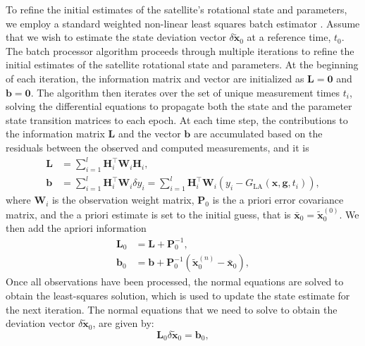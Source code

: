 \documentclass[lineno, pdflatex,sn-mathphys-ay]{sn-jnl}
\theoremstyle{thmstyleone}%
\theoremstyle{thmstyletwo}%
\theoremstyle{thmstylethree}%
\renewcommand{\vec}[1]{\boldsymbol{#1}}
\begin{document}
	To refine the initial estimates of the satellite's rotational state and parameters, we employ a standard weighted non-linear least squares batch estimator \citep[e.g.,][]{2004sod..book.....T}. 
	Assume that we wish to estimate the state deviation vector $\delta\tilde{\vec{x}}_0$ at a reference time, $t_0$.
	The batch processor algorithm proceeds through multiple iterations to refine the initial estimates of the satellite rotational state and parameters. At the beginning of each iteration, the information matrix and vector are initialized as ${\vec{L} = \vec{0}}$ and ${\vec{b} = \vec{0}}$. The algorithm then iterates over the set of unique measurement times $t_i$, solving the differential equations to propagate both the state and the parameter state transition matrices to each epoch.
	At each time step, the contributions to the information matrix $\vec{L}$ and the vector $\vec{b}$ are accumulated based on the residuals between the observed and computed measurements, and it is
	\begin{align}
		\vec{L} &=  \displaystyle\sum_{i = 1}^{l} \vec{H}_i^\top  \vec{W}_i \vec{H}_i, 
		\\%
		\vec{b} &= 	
		\displaystyle\sum_{i = 1}^{l} \vec{H}_i^\top   \vec{W}_i \delta{y}_i = 
		\displaystyle\sum_{i = 1}^{l} \vec{H}_i^\top  \vec{W}_i ( {y}_i -  {G}_{\mathrm{LA}}(	\vec{x},  \vec{g}, t_i)),
	\end{align}
	where $\vec{W}_i $ is the observation weight matrix, $\vec{P}_0$ is the a priori error covariance matrix, and the a priori estimate is set to the initial guess, that is ${\vec{\bar{x}}_0 = \tilde{\vec{x}}_0^{(0)}}$.
	We then add the apriori information
	\begin{align}
		\vec{L}_0 &= 	\vec{L} + \vec{P}_0^{-1}, 
		\\%
		\vec{b}_0 &= 	
		\vec{b} + \vec{P}_0^{-1} \left( \tilde{\vec{x}}_0^{(n)} - \vec{\bar{x}}_0 \right),
	\end{align}
	Once all observations have been processed, the normal equations are solved to obtain the least-squares solution, which is used to update the state estimate for the next iteration.
	The normal equations that we need to solve to obtain the deviation vector $ \delta\tilde{\vec{x}}_0$, 
	are given by:
	\begin{equation}
		\vec{L}_0  \delta\tilde{\vec{x}}_0 = \vec{b}_0,
	\end{equation}
\end{document}
